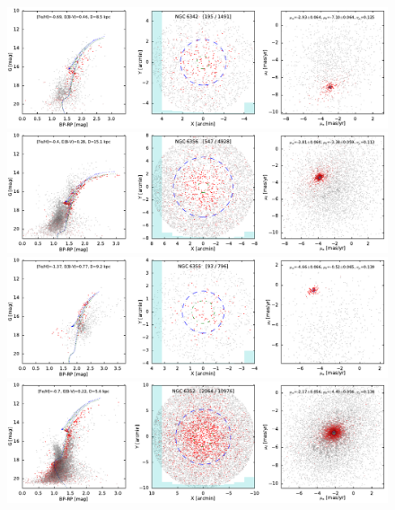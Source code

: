 \documentclass[usenatbib]{mnras}
\begin{document}
\clearpage\begin{figure}
\contcaption{}
\includegraphics{figs/NGC_6342.pdf}
\includegraphics{figs/NGC_6356.pdf}
\includegraphics{figs/NGC_6355.pdf}
\includegraphics{figs/NGC_6352.pdf}
\end{figure}
\end{document}
